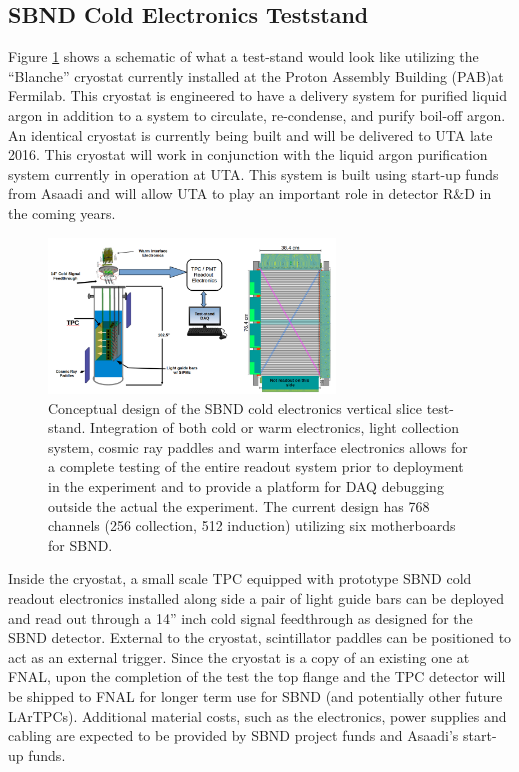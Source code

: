\subsection{SBND Cold Electronics Teststand}\label{sec:SBNDTeststand}
Figure \ref{fig:teststand} shows a schematic of what a test-stand would look like utilizing the ``Blanche'' cryostat currently installed at the Proton Assembly Building (PAB)at Fermilab. This cryostat is engineered to have a delivery system for purified liquid argon in addition to a system to circulate, re-condense, and purify boil-off argon. An identical cryostat is currently being built and will be delivered to UTA late 2016. This cryostat will work in conjunction with the liquid argon purification system currently in operation at UTA. This system is built using start-up funds from Asaadi and will allow UTA to play an important role in detector R$\&$D in the coming years. 

\begin{figure}[htb]
\centering
\includegraphics[width=0.68\textwidth]{images/teststand3.png}
\caption[]{Conceptual design of the SBND cold electronics vertical slice test-stand. Integration of both cold or warm electronics, light collection system, cosmic ray paddles and warm interface electronics allows for a complete testing of the entire readout system prior to deployment in the experiment and to provide a platform for DAQ debugging outside the actual the experiment. The current design has 768 channels (256 collection, 512 induction) utilizing six motherboards for SBND.}
\label{fig:teststand}
\end{figure} 

Inside the cryostat, a small scale TPC equipped with prototype SBND cold readout electronics installed along side a pair of light guide bars can be deployed and read out through a 14'' inch cold signal feedthrough as designed for the SBND detector. External to the cryostat, scintillator paddles can be positioned to act as an external trigger. Since the cryostat is a copy of an existing one at FNAL, upon the completion of the test the top flange and the TPC detector will be shipped to FNAL for longer term use for SBND (and potentially other future LArTPCs). Additional material costs, such as the electronics, power supplies and cabling are expected to be provided by SBND project funds and Asaadi's start-up funds.


